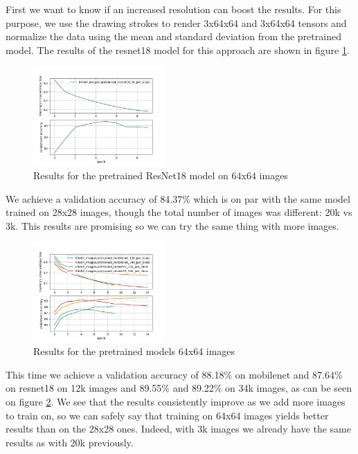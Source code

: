 \documentclass[10pt,twocolumn,letterpaper]{article}
\begin{document}
First we want to know if an increased resolution can boost the results. For this purpose, we use the drawing strokes to render 3x64x64 and 3x64x64 tensors and normalize the data using the mean and standard deviation from the pretrained model. The results of the resnet18 model for this approach are shown in figure \ref{fig:resnet_64_3k}.


\begin{figure}[h] 
\centering
\includegraphics[width=0.45\textwidth]{images/imgen_resnet18_3k.png}
\caption{Results for the pretrained ResNet18 model on 64x64 images}
\label{fig:resnet_64_3k}
\end{figure}


We achieve a validation accuracy of 84.37\% which is on par with the same model trained on 28x28 images, though the total number of images was different: 20k vs 3k. This results are promising so we can try the same thing with more images.

\begin{figure}[h] 
\centering
\includegraphics[width=0.45\textwidth]{images/imgen_64.png}
\caption{Results for the pretrained models 64x64 images}
\label{fig:imgen_64}
\end{figure}

This time we achieve a validation accuracy of 88.18\% on mobilenet and 87.64\% on resnet18 on 12k images and 89.55\% and 89.22\% on 34k images, as can be seen on figure \ref{fig:imgen_64}. We see that the results consistently improve as we add more images to train on, so we can safely say that training on 64x64 images yields better results than on the 28x28 ones. Indeed, with 3k images we already have the same results as with 20k previously.
\end{document}
